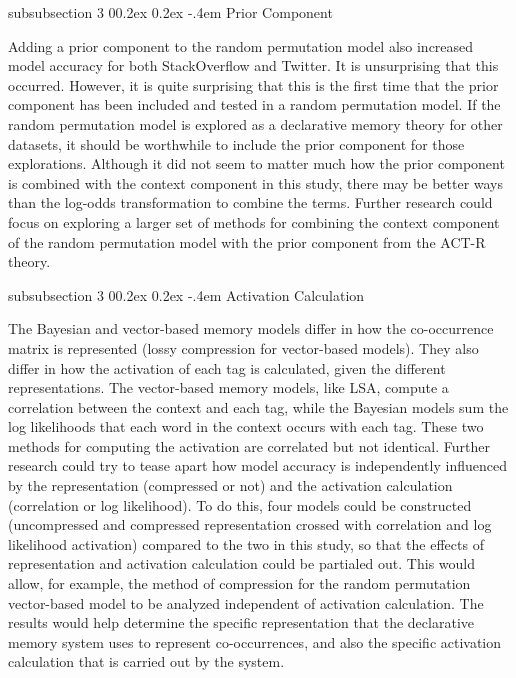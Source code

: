\documentclass[man,floatsintext,donotrepeattitle]{apa6}
\makeatletter
\renewcommand{\subsubsection}{%
  \@startsection
  {subsubsection}%
  {3}%
  {\parindent}%
  {0\baselineskip \@plus 0.2ex \@minus 0.2ex}%
  {-.4em}%
  {\normalfont\normalsize\bfseries\addperi}}
\makeatother
\begin{document}
\subsubsection{Prior Component}

Adding a prior component to the random permutation model also increased model accuracy for both StackOverflow and Twitter.
It is unsurprising that this occurred.
However, it is quite surprising that this is the first time that the prior component has been included and tested in a random permutation model.
If the random permutation model is explored as a declarative memory theory for other datasets, it should be worthwhile to include the prior component for those explorations.
Although it did not seem to matter much how the prior component is combined with the context component in this study, 
there may be better ways than the log-odds transformation to combine the terms.
Further research could focus on exploring a larger set of methods for combining the context component of the random permutation model with the prior component from the ACT-R theory.

\subsubsection{Activation Calculation}

The Bayesian and vector-based memory models differ in how the co-occurrence matrix is represented (lossy compression for vector-based models).
They also differ in how the activation of each tag is calculated, given the different representations.
The vector-based memory models, like LSA, compute a correlation between the context and each tag, while the Bayesian models sum the log likelihoods that each word in the context occurs with each tag.
These two methods for computing the activation are correlated but not identical.
Further research could try to tease apart how model accuracy is independently influenced by the representation (compressed or not) and the activation calculation (correlation or log likelihood).
To do this, four models could be constructed (uncompressed and compressed representation crossed with correlation and log likelihood activation) compared to the two in this study,
so that the effects of representation and activation calculation could be partialed out.
This would allow, for example, the method of compression for the random permutation vector-based model to be analyzed independent of activation calculation.
The results would help determine the specific representation that the declarative memory system uses to represent co-occurrences,
and also the specific activation calculation that is carried out by the system.
\end{document}
